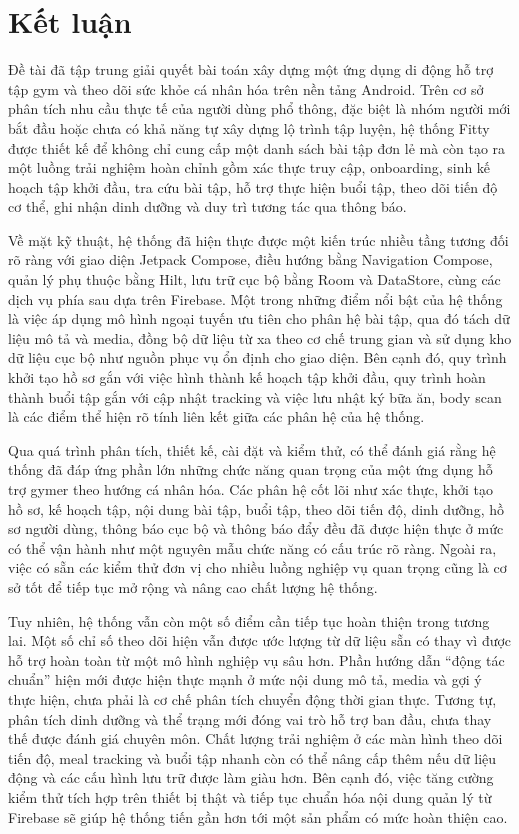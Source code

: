 \chapter*{Kết luận}

Đề tài đã tập trung giải quyết bài toán xây dựng một ứng dụng di động hỗ trợ tập gym và theo dõi sức khỏe cá nhân hóa trên nền tảng Android. Trên cơ sở phân tích nhu cầu thực tế của người dùng phổ thông, đặc biệt là nhóm người mới bắt đầu hoặc chưa có khả năng tự xây dựng lộ trình tập luyện, hệ thống Fitty được thiết kế để không chỉ cung cấp một danh sách bài tập đơn lẻ mà còn tạo ra một luồng trải nghiệm hoàn chỉnh gồm xác thực truy cập, onboarding, sinh kế hoạch tập khởi đầu, tra cứu bài tập, hỗ trợ thực hiện buổi tập, theo dõi tiến độ cơ thể, ghi nhận dinh dưỡng và duy trì tương tác qua thông báo.

Về mặt kỹ thuật, hệ thống đã hiện thực được một kiến trúc nhiều tầng tương đối rõ ràng với giao diện Jetpack Compose, điều hướng bằng Navigation Compose, quản lý phụ thuộc bằng Hilt, lưu trữ cục bộ bằng Room và DataStore, cùng các dịch vụ phía sau dựa trên Firebase. Một trong những điểm nổi bật của hệ thống là việc áp dụng mô hình ngoại tuyến ưu tiên cho phân hệ bài tập, qua đó tách dữ liệu mô tả và media, đồng bộ dữ liệu từ xa theo cơ chế trung gian và sử dụng kho dữ liệu cục bộ như nguồn phục vụ ổn định cho giao diện. Bên cạnh đó, quy trình khởi tạo hồ sơ gắn với việc hình thành kế hoạch tập khởi đầu, quy trình hoàn thành buổi tập gắn với cập nhật tracking và việc lưu nhật ký bữa ăn, body scan là các điểm thể hiện rõ tính liên kết giữa các phân hệ của hệ thống.

Qua quá trình phân tích, thiết kế, cài đặt và kiểm thử, có thể đánh giá rằng hệ thống đã đáp ứng phần lớn những chức năng quan trọng của một ứng dụng hỗ trợ gymer theo hướng cá nhân hóa. Các phân hệ cốt lõi như xác thực, khởi tạo hồ sơ, kế hoạch tập, nội dung bài tập, buổi tập, theo dõi tiến độ, dinh dưỡng, hồ sơ người dùng, thông báo cục bộ và thông báo đẩy đều đã được hiện thực ở mức có thể vận hành như một nguyên mẫu chức năng có cấu trúc rõ ràng. Ngoài ra, việc có sẵn các kiểm thử đơn vị cho nhiều luồng nghiệp vụ quan trọng cũng là cơ sở tốt để tiếp tục mở rộng và nâng cao chất lượng hệ thống.

Tuy nhiên, hệ thống vẫn còn một số điểm cần tiếp tục hoàn thiện trong tương lai. Một số chỉ số theo dõi hiện vẫn được ước lượng từ dữ liệu sẵn có thay vì được hỗ trợ hoàn toàn từ một mô hình nghiệp vụ sâu hơn. Phần hướng dẫn ``động tác chuẩn'' hiện mới được hiện thực mạnh ở mức nội dung mô tả, media và gợi ý thực hiện, chưa phải là cơ chế phân tích chuyển động thời gian thực. Tương tự, phân tích dinh dưỡng và thể trạng mới đóng vai trò hỗ trợ ban đầu, chưa thay thế được đánh giá chuyên môn. Chất lượng trải nghiệm ở các màn hình theo dõi tiến độ, meal tracking và buổi tập nhanh còn có thể nâng cấp thêm nếu dữ liệu động và các cấu hình lưu trữ được làm giàu hơn. Bên cạnh đó, việc tăng cường kiểm thử tích hợp trên thiết bị thật và tiếp tục chuẩn hóa nội dung quản lý từ Firebase sẽ giúp hệ thống tiến gần hơn tới một sản phẩm có mức hoàn thiện cao.

